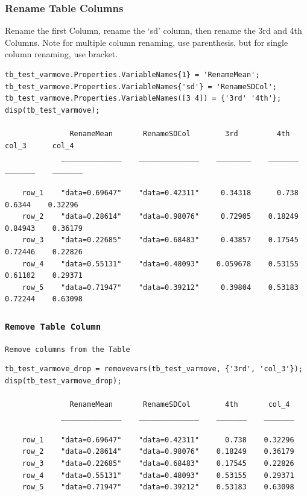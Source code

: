 \documentclass[
]{book}
\begin{document}
\hypertarget{rename-table-columns}{%
\subsubsection{Rename Table Columns}\label{rename-table-columns}}

Rename the first Column, rename the `sd' column, then rename the 3rd and
4th Columns. Note for multiple column renaming, use parenthesis, but for
single column renaming, use bracket.

\begin{verbatim}
tb_test_varmove.Properties.VariableNames{1} = 'RenameMean';
tb_test_varmove.Properties.VariableNames{'sd'} = 'RenameSDCol';
tb_test_varmove.Properties.VariableNames([3 4]) = {'3rd' '4th'};
disp(tb_test_varmove);

               RenameMean       RenameSDCol        3rd         4th       col_3      col_4 
             ______________    ______________    ________    _______    _______    _______

    row_1    "data=0.69647"    "data=0.42311"     0.34318      0.738     0.6344    0.32296
    row_2    "data=0.28614"    "data=0.98076"     0.72905    0.18249    0.84943    0.36179
    row_3    "data=0.22685"    "data=0.68483"     0.43857    0.17545    0.72446    0.22826
    row_4    "data=0.55131"    "data=0.48093"    0.059678    0.53155    0.61102    0.29371
    row_5    "data=0.71947"    "data=0.39212"     0.39804    0.53183    0.72244    0.63098
\end{verbatim}

\hypertarget{remove-table-column}{%
\subsubsection{\texorpdfstring{\texttt{Remove\ Table\ Column}}{Remove Table Column}}\label{remove-table-column}}

\texttt{Remove\ columns\ from\ the\ Table}

\begin{verbatim}
tb_test_varmove_drop = removevars(tb_test_varmove, {'3rd', 'col_3'});
disp(tb_test_varmove_drop);

               RenameMean       RenameSDCol        4th       col_4 
             ______________    ______________    _______    _______

    row_1    "data=0.69647"    "data=0.42311"      0.738    0.32296
    row_2    "data=0.28614"    "data=0.98076"    0.18249    0.36179
    row_3    "data=0.22685"    "data=0.68483"    0.17545    0.22826
    row_4    "data=0.55131"    "data=0.48093"    0.53155    0.29371
    row_5    "data=0.71947"    "data=0.39212"    0.53183    0.63098
\end{verbatim}
\end{document}
